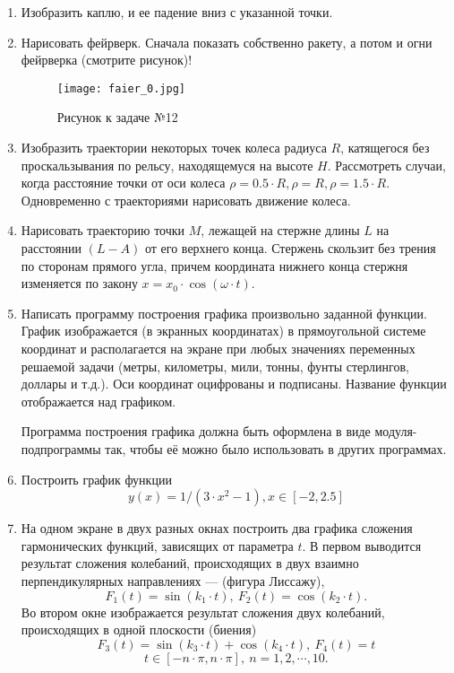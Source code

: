 \begin{enumerate}
 \item  Изобразить каплю, и ее падение вниз с указанной точки.
  
 \item  Нарисовать фейрверк. Сначала показать  собственно ракету, а  потом и огни фейрверка  (смотрите рисунок)!
 
\begin{figure}[!h]
\centerline{
\texttt{[image: faier\_0.jpg]}}
\caption{Рисунок к задаче №12}
\label{ris4}
\end{figure}

\item  Изобразить траектории некоторых точек колеса радиуса $R$, катящегося без проскальзывания по рельсу, находящемуся на высоте $H$. Рассмотреть случаи, когда расстояние точки от оси колеса $\rho = 0.5\cdot R, \rho = R, \rho = 1.5\cdot R$. Одновременно с траекториями нарисовать движение колеса.

\item Нарисовать траекторию точки $M$, лежащей на стержне длины $L$ на расстоянии $(L- A)$ от его верхнего конца. Стержень скользит без трения по сторонам прямого угла, причем координата нижнего конца стержня изменяется по закону $x = x_0\cdot\cos(\omega\cdot t)$.

\item Написать программу построения графика произвольно заданной функции. График изображается (в экранных координатах) в прямоугольной системе координат и располагается на экране при любых значениях переменных решаемой задачи (метры, километры, мили, тонны, фунты стерлингов, доллары и т.д.). Оси координат оцифрованы и подписаны. Название функции отображается над графиком.

Программа построения графика должна быть оформлена в виде модуля-подпрограммы так, чтобы её можно было использовать в других программах.

\item Построить график функции
$$y(x)= 1/(3\cdot x^2-1), x \in[-2,2.5]$$

\item На одном экране в двух разных окнах построить два графика сложения гармонических функций, зависящих от параметра $t$. В первом выводится результат сложения колебаний, происходящих в двух взаимно перпендикулярных направлениях --- (фигура Лиссажу),
$$F_1(t) = \sin(k_1\cdot t), \:F_2(t) = \cos(k_2\cdot t).$$
Во втором окне изображается результат сложения двух колебаний, происходящих в одной плоскости (биения)
$$F_3(t) = \sin(k_3\cdot t) + \cos(k_4\cdot t), \:F_4(t) = t$$
$$t\in [-n\cdot \pi, n\cdot \pi], \:n = 1,2,\cdots, 10.  $$


\end{enumerate}
